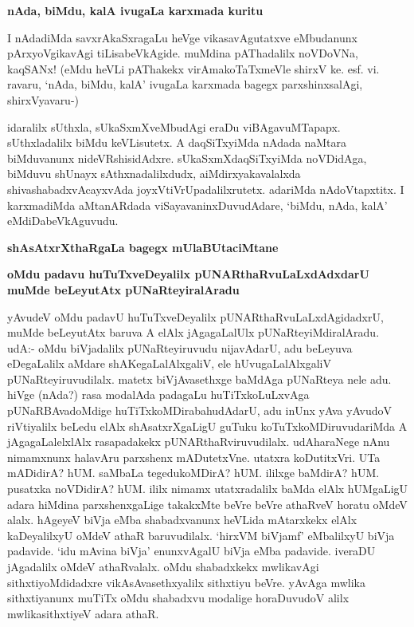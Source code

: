{\bigskip
\noindent
{\large\bf nAda, biMdu, kalA ivugaLa karxmada kuritu}}\label{page177}
\medskip

\noindent
I nAdadiMda savxrAkaSxragaLu heVge vikasavAgutatxve eMbudanunx pArxyoVgikavAgi tiLisabeVkAgide. muMdina pAThadalilx noVDoVNa, kaqSANx! (eMdu heVLi pAThakekx virAmakoTaTxmeVle shirxV ke. esf. vi. ravaru, `nAda, biMdu, kalA' ivugaLa karxmada bagegx parxshinxsalAgi, shirxVyavaru-)


idaralilx sUthxla, sUkaSxmXveMbudAgi eraDu viBAgavuMTapapx. sUthxladalilx biMdu keVLisutetx. A daqSiTxyiMda nAdada naMtara biMduvanunx nideVRshisidAdxre. sUkaSxmXdaqSiTxyiMda noVDidAga, biMduvu shUnayx sAthxnadalilxdudx, aiMdirxyakavalalxda shivashabadxvAcayxvAda joyxVtiVrUpadalilxrutetx. adariMda nAdoVtapxtitx. I karxmadiMda aMtanARdada viSayavaninxDuvudAdare, `biMdu, nAda, kalA' eMdiDabeVkAguvudu.


\bigskip

\begin{center}
{\bf\Large{shAsAtxrXthaRgaLa bagegx mUlaBUtaciMtane}}
\end{center}

{\medskip
\noindent
{\large\bf oMdu padavu huTuTxveDeyalilx pUNARthaRvuLaLxdAdxdarU muMde beLeyutAtx pUNaRteyiralAradu}}\label{page177a}
\medskip

\noindent
yAvudeV oMdu padavU huTuTxveDeyalilx pUNARthaRvuLaLxdAgidadxrU, muMde beLeyutAtx baruva A elAlx jAgagaLalUlx pUNaRteyiMdiralAradu. udA:- oMdu biVjadalilx pUNaRteyiruvudu nijavAdarU, adu beLeyuva eDegaLalilx aMdare shAKegaLalAlxgaliV, ele hUvugaLalAlxgaliV pUNaRteyiruvudilalx. matetx biVjAvasethxge baMdAga pUNaRteya nele adu. hiVge (nAda?) rasa modalAda padagaLu huTiTxkoLuLxvAga pUNaRBAvadoMdige huTiTxkoMDirabahudAdarU, adu inUnx yAva yAvudoV riVtiyalilx beLedu elAlx shAsatxrXgaLigU guTuku koTuTxkoMDiruvudariMda A jAgagaLalelxlAlx rasapadakekx pUNARthaRviruvudilalx. udAharaNege nAnu nimamxnunx halavAru parxshenx mADutetxVne. utatxra koDutitxVri. UTa mADidirA? hUM. saMbaLa tegedukoMDirA? hUM. ililxge baMdirA? hUM. pusatxka noVDidirA? hUM. ililx nimamx utatxradalilx baMda elAlx hUMgaLigU adara hiMdina parxshenxgaLige takakxMte beVre beVre athaRveV horatu oMdeV alalx. hAgeyeV biVja eMba shabadxvanunx heVLida mAtarxkekx elAlx kaDeyalilxyU oMdeV athaR baruvudilalx. `hirxVM biVjamf' eMbalilxyU biVja padavide. `idu mAvina biVja' enunxvAgalU biVja eMba padavide. iveraDU jAgadalilx oMdeV athaRvalalx. oMdu shabadxkekx mwlikavAgi sithxtiyoMdidadxre vikAsAvasethxyalilx sithxtiyu beVre. yAvAga mwlika sithxtiyanunx muTiTx oMdu shabadxvu modalige horaDuvudoV alilx mwlikasithxtiyeV adara athaR.

